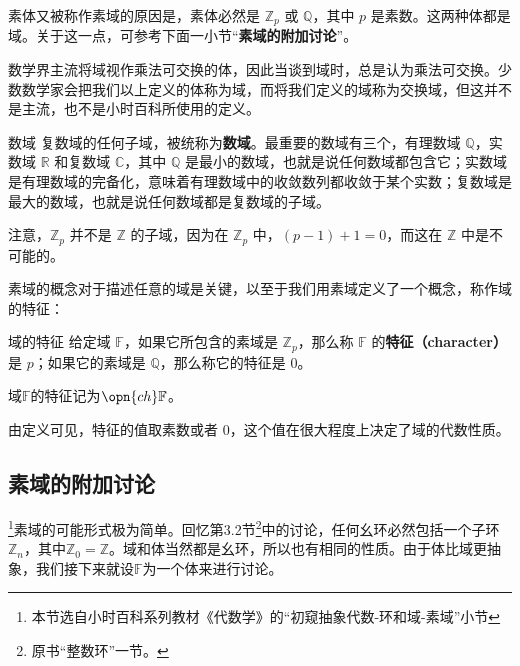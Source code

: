 素体又被称作素域的原因是，素体必然是 $\mathbb{Z}_p$ 或 $\mathbb{Q}$，其中 $p$ 是素数。这两种体都是域。关于这一点，可参考下面一小节“\textbf{素域的附加讨论}”。




数学界主流将域视作乘法可交换的体，因此当谈到域时，总是认为乘法可交换。少数数学家会把我们以上定义的体称为域，而将我们定义的域称为交换域，但这并不是主流，也不是小时百科所使用的定义。

\begin{example}{数域}
复数域的任何子域，被统称为\textbf{数域}。最重要的数域有三个，有理数域 $\mathbb{Q}$，实数域 $\mathbb{R}$ 和复数域 $\mathbb{C}$，其中 $\mathbb{Q}$ 是最小的数域，也就是说任何数域都包含它；实数域是有理数域的完备化，意味着有理数域中的收敛数列都收敛于某个实数；复数域是最大的数域，也就是说任何数域都是复数域的子域。

注意，$\mathbb{Z}_p$ 并不是 $\mathbb{Z}$ 的子域，因为在 $\mathbb{Z}_p$ 中，$(p-1)+1=0$，而这在 $\mathbb{Z}$ 中是不可能的。
\end{example}

素域的概念对于描述任意的域是关键，以至于我们用素域定义了一个概念，称作域的特征：

\begin{definition}{域的特征}\label{def_field_2}
给定域 $\mathbb{F}$，如果它所包含的素域是 $\mathbb{Z}_p$，那么称 $\mathbb{F}$ 的\textbf{特征（character）}是 $p$；如果它的素域是 $\mathbb{Q}$，那么称它的特征是 $0$。

域$\mathbb{F}$的特征记为$\opn{ch}\mathbb{F}$。
\end{definition}

由定义可见，特征的值取素数或者 $0$，这个值在很大程度上决定了域的代数性质。


\subsection{素域的附加讨论}

\footnote{本节选自小时百科系列教材《代数学》的“初窥抽象代数-环和域-素域”小节}素域的可能形式极为简单。回忆第3.2节\footnote{原书“整数环”一节。}中的讨论，任何幺环必然包括一个子环$\mathbb{Z}_n$，其中$\mathbb{Z}_0=\mathbb{Z}$。域和体当然都是幺环，所以也有相同的性质。由于体比域更抽象，我们接下来就设$\mathbb{F}$为一个体来进行讨论。

